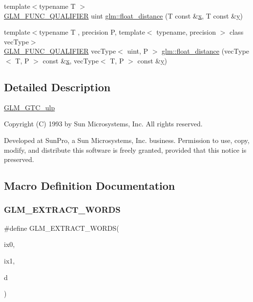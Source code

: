 \begin{DoxyCompactItemize}
\item 
{\footnotesize template$<$typename T $>$ }\\\mbox{\hyperlink{setup_8hpp_a33fdea6f91c5f834105f7415e2a64407}{G\+L\+M\+\_\+\+F\+U\+N\+C\+\_\+\+Q\+U\+A\+L\+I\+F\+I\+ER}} uint \mbox{\hyperlink{group__gtc__ulp_ga2e09bd6c8b0a9c91f6f5683d68245634}{glm\+::float\+\_\+distance}} (T const \&\mbox{\hyperlink{glad_8h_a92d0386e5c19fb81ea88c9f99644ab1d}{x}}, T const \&\mbox{\hyperlink{glad_8h_a66ddd433d2cacfe27f5906b7e86faeed}{y}})
\item 
{\footnotesize template$<$typename T , precision P, template$<$ typename, precision $>$ class vec\+Type$>$ }\\\mbox{\hyperlink{setup_8hpp_a33fdea6f91c5f834105f7415e2a64407}{G\+L\+M\+\_\+\+F\+U\+N\+C\+\_\+\+Q\+U\+A\+L\+I\+F\+I\+ER}} vec\+Type$<$ uint, P $>$ \mbox{\hyperlink{namespaceglm_a2e00104097b2f3967e97131933595309}{glm\+::float\+\_\+distance}} (vec\+Type$<$ T, P $>$ const \&\mbox{\hyperlink{glad_8h_a92d0386e5c19fb81ea88c9f99644ab1d}{x}}, vec\+Type$<$ T, P $>$ const \&\mbox{\hyperlink{glad_8h_a66ddd433d2cacfe27f5906b7e86faeed}{y}})
\end{DoxyCompactItemize}


\subsection{Detailed Description}
\mbox{\hyperlink{group__gtc__ulp}{G\+L\+M\+\_\+\+G\+T\+C\+\_\+ulp}}

Copyright (C) 1993 by Sun Microsystems, Inc. All rights reserved.

Developed at Sun\+Pro, a Sun Microsystems, Inc. business. Permission to use, copy, modify, and distribute this software is freely granted, provided that this notice is preserved. 

\subsection{Macro Definition Documentation}
\mbox{\label{ulp_8inl_a037d712bb7eec79dcd0073eb07d3f3e8}} 
\subsubsection{\texorpdfstring{GLM\_EXTRACT\_WORDS}{GLM\_EXTRACT\_WORDS}}
{\footnotesize\ttfamily \#define G\+L\+M\+\_\+\+E\+X\+T\+R\+A\+C\+T\+\_\+\+W\+O\+R\+DS(\begin{DoxyParamCaption}\item[{}]{ix0,  }\item[{}]{ix1,  }\item[{}]{d }\end{DoxyParamCaption})}


